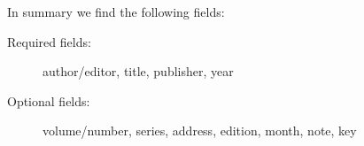 \begin{sphinxVerbatim}[commandchars=\\\{\}]
             
             
         
             
          
        
             
             
             
            
            
      
       
             
          
    
\end{sphinxVerbatim}

In summary we find the following fields:
\begin{description}
\item[{Required fields:}] \leavevmode
author/editor, title, publisher, year

\item[{Optional fields:}] \leavevmode
volume/number, series, address, edition, month, note, key

\end{description}

